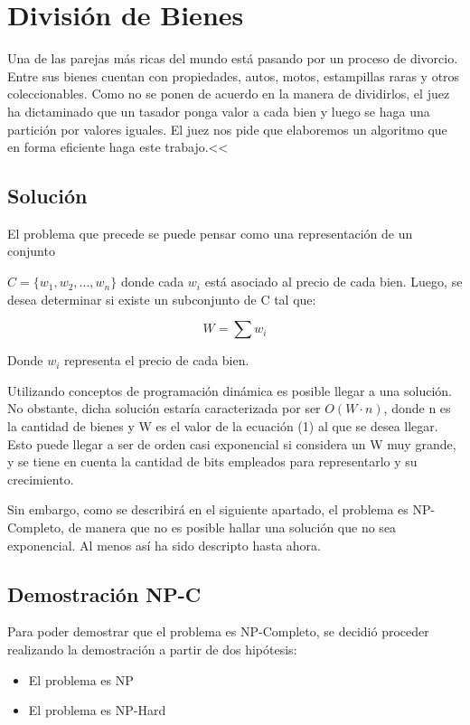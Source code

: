 \section{División de Bienes}

Una de las parejas más ricas del mundo está pasando por un proceso de divorcio. Entre sus bienes cuentan con propiedades, autos, motos, estampillas raras y otros coleccionables. Como no se ponen de acuerdo en la manera de dividirlos, el juez ha dictaminado que un tasador ponga valor a cada bien y luego se haga una partición por valores iguales. El juez nos pide que elaboremos un algoritmo que en forma eficiente haga este trabajo.<<\newline

\subsection{Solución}
El problema que precede se puede pensar como una representación de un conjunto

$C=\{w_{1}, w_{2}, ..., w_{n}\}$ donde cada $w_{i}$ está asociado al precio de cada bien. Luego, se desea determinar si existe un subconjunto de C tal que:

\begin{equation}
    W=\sum w_{i}
\end{equation}

Donde $w_{i}$ representa el precio de cada bien.

Utilizando conceptos de programación dinámica es posible llegar a una solución. No obstante, dicha solución estaría caracterizada por ser $O(W\cdot n)$, donde n es la cantidad de bienes y W es el valor de la ecuación (1) al que se desea llegar. Esto puede llegar a ser de orden casi exponencial si considera un W muy grande, y se tiene en cuenta la cantidad de bits empleados para representarlo y su crecimiento.

Sin embargo, como se describirá en el siguiente apartado, el problema es NP-Completo, de manera que no es posible hallar una solución que no sea exponencial. Al menos así ha sido descripto hasta ahora.

\subsection{Demostración NP-C}
Para poder demostrar que el problema es NP-Completo, se decidió proceder realizando la demostración a partir de dos hipótesis:
\begin{itemize}
    \item El problema es NP
    \item El problema es NP-Hard
\end{itemize}

